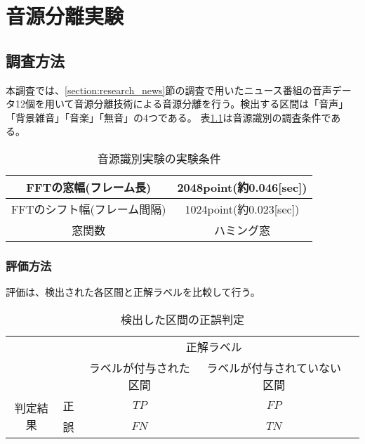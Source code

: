 \chapter{音源分離実験}
\label{section:devide_audio}


\section{調査方法}
本調査では、\ref{section:research_news}節の調査で用いたニュース番組の音声データ12個を用いて音源分離技術による音源分離を行う。検出する区間は「音声」「背景雑音」「音楽」「無音」の4つである。
表\ref{table:detail_identification_method1}は音源識別の調査条件である。

\begin{table}[H]
  \begin{center}
    \caption{音源識別実験の実験条件 \label{table:detail_identification_method1}}
    \begin{tabular}{|c||c|} \hline
      FFTの窓幅(フレーム長) & 2048point(約0.046[sec])   \\ \hline
      FFTのシフト幅(フレーム間隔) &  1024point(約0.023[sec]) \\ \hline
      窓関数 & ハミング窓  \\ \hline
    \end{tabular}
  \end{center}
\end{table}

\subsection{評価方法}
評価は、検出された各区間と正解ラベルを比較して行う。

\begin{table}[H]
\begin{center}
    \caption{検出した区間の正誤判定 \label{table:search_table_ap}}
\begin{tabular}{|c|c|c|c|l}
\cline{1-4}
\multicolumn{2}{|c|}{\multirow{2}{*}{}} & \multicolumn{2}{c|}{正解ラベル} &  \\ \cline{3-4}
\multicolumn{2}{|c|}{}                  & ラベルが付与された区間        &    ラベルが付与されていない区間     &  \\ \cline{1-4}
\multirow{2}{*}{判定結果}        & 正        & $TP$                  & $FP$                   &  \\ \cline{2-4}
& 誤        & $FN$                  & $TN$                   &  \\ \cline{1-4}
\end{tabular}
\end{center}
\end{table}


